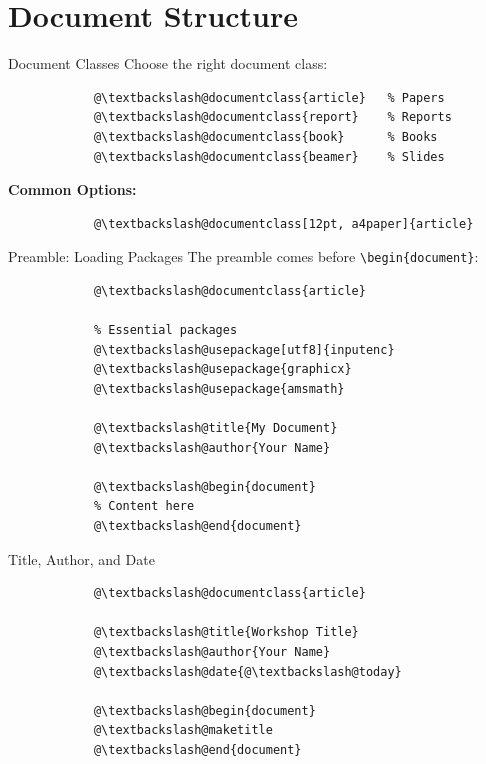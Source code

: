\documentclass[aspectratio=169]{beamer}
\begin{document}
	\section{Document Structure}
	
	\begin{frame}[fragile]{Document Classes}
		Choose the right document class:
		
		\begin{lstlisting}
			@\textbackslash@documentclass{article}   % Papers
			@\textbackslash@documentclass{report}    % Reports
			@\textbackslash@documentclass{book}      % Books
			@\textbackslash@documentclass{beamer}    % Slides
		\end{lstlisting}
		
		\vspace{1em}
		
		\textbf{Common Options:}
		\begin{lstlisting}
			@\textbackslash@documentclass[12pt, a4paper]{article}
		\end{lstlisting}
	\end{frame}
	
	\begin{frame}[fragile]{Preamble: Loading Packages}
		The preamble comes before \texttt{\textbackslash begin\{document\}}:
		
		\begin{lstlisting}
			@\textbackslash@documentclass{article}
			
			% Essential packages
			@\textbackslash@usepackage[utf8]{inputenc}
			@\textbackslash@usepackage{graphicx}
			@\textbackslash@usepackage{amsmath}
			
			@\textbackslash@title{My Document}
			@\textbackslash@author{Your Name}
			
			@\textbackslash@begin{document}
			% Content here
			@\textbackslash@end{document}
		\end{lstlisting}
	\end{frame}
	
	\begin{frame}[fragile]{Title, Author, and Date}
		\begin{lstlisting}
			@\textbackslash@documentclass{article}
			
			@\textbackslash@title{Workshop Title}
			@\textbackslash@author{Your Name}
			@\textbackslash@date{@\textbackslash@today}
			
			@\textbackslash@begin{document}
			@\textbackslash@maketitle
			@\textbackslash@end{document}
		\end{lstlisting}
	\end{frame}
	
\end{document}
